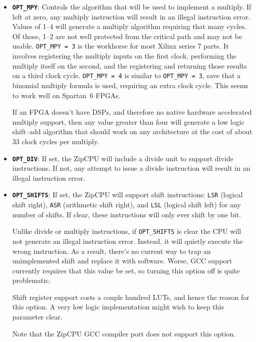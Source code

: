 \documentclass{gqtekspec}
\begin{document}
\begin{itemize}
\item {\bf\tt OPT\_MPY}: Controls the algorithm that will be used to implement
	a multiply.  If left at zero, any multiply instruction will result in
	an illegal instruction error.  Values of 1--4 will generate a multiply
	algorithm requiring that many cycles.  Of those, 1--2 are not well
	protected from the critical path and may not be usable.
	{\tt  OPT\_MPY = 3} is the workhorse for most Xilinx series 7 parts.
	It involves registering the multiply inputs on the first clock,
	performing the multiply itself on the second, and the registering and
	returning those results on a third clock cycle.  {\tt  OPT\_MPY = 4}
	is similar to {\tt OPT\_MPY = 3}, save that a binomial multiply formula
	is used, requiring an extra clock cycle.  This seems to work well on
	Spartan~6 FPGAs.

	If an FPGA doesn't have DSPs, and therefore no native hardware
	accelerated multiply support, then any value greater than four will
	generate a low logic shift--add algorithm that should work on any
	architecture at the cost of about 33 clock cycles per multiply.

\item {\bf\tt OPT\_DIV}: If set, the ZipCPU will include a divide unit to
	support divide instructions.  If not, any attempt to issue a divide
	instruction will result in an illegal instruction error.

\item {\bf\tt OPT\_SHIFTS}: If set, the ZipCPU will support shift instructions:
	{\tt LSR} (logical shift right), {\tt ASR} (arithmetic shift right),
	and {\tt LSL} (logical shift left) for any number of shifts.  If clear,
	these instructions will only ever shift by one bit.

	Unlike divide or multiply instructions, if {\tt OPT\_SHIFTS} is clear
	the CPU will not generate an illegal instruction error.  Instead, it
	will quietly execute the wrong instruction.  As a result, there's no
	current way to trap an unimplemented shift and replace it with software.
	Worse, GCC support currently requires that this value be set, so
	turning this option off is quite problematic.

	Shift register support costs a couple hundred LUTs, and hence the
	reason for this option.  A very low logic implementation
	might wish to keep this parameter clear.

	Note that the ZipCPU GCC compiler port does not support this option.


\end{itemize}
\end{document}
